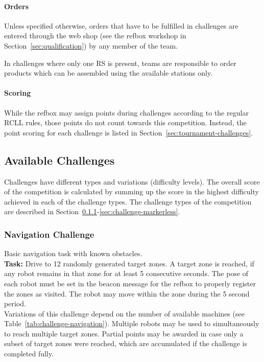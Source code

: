 \documentclass[12pt,twoside]{article}
\newcommand{\refsec}[1]{Section~\ref{#1}}
\newcommand{\reftab}[1]{Table~\ref{#1}}
\begin{document}
\paragraph{Orders}
Unless specified otherwise, orders that have to be fulfilled in challenges
are entered through the web shop
(see the \ac{refbox} workshop in \refsec{sec:qualification})
by any member of the team.

In challenges where only one \ac{RS} is present, teams are responsible to
order products which can be assembled using the available stations only.

\paragraph{Scoring}\label{sec:scoring}
While the \ac{refbox} may assign points during challenges according to the
regular \ac{RCLL} rules, those points do not count towards this competition.
Instead, the point scoring for each challenge is listed in
\refsec{sec:tournament-challenges}.

\subsection{Available Challenges}
\label{sec:challenges}
Challenges have different types and variations (difficulty levels).
The overall score of the competition is calculated by summing up the score
in the highest difficulty achieved in each of the challenge types.
The challenge types of the competition are described in
\refsec{sec:challenge-navigation}-\ref{sec:challenge-markerless}.


\subsubsection{Navigation Challenge}\label{sec:challenge-navigation}
Basic navigation task with known obstacles.\\
\textbf{Task:} Drive to 12 randomly generated target zones. A target zone is
reached, if any robot remains in that zone for at least 5 consecutive seconds.
The pose of each robot must be set in the beacon message
for the \ac{refbox} to properly register the zones as visited.
The robot may move within the zone during the 5 second period.\\
Variations of this challenge depend on the number of available machines
(see \reftab{tab:challenge-navigation}).
Multiple robots may be used to simultaneously to reach multiple target zones.
Partial points may be awarded in case only a subset of target zones were
reached, which are accumulated if the challenge is completed fully.
\end{document}

